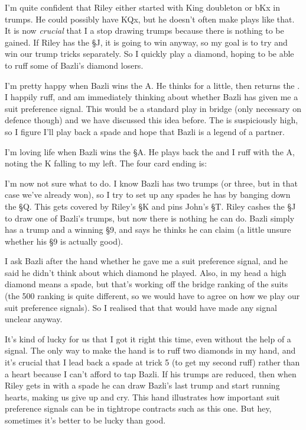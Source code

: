 \documentclass[a4paper]{JoshCards}
\begin{document}
I'm quite confident that Riley either started with King doubleton or bKx in trumps. He could possibly have KQx, but he doesn't often make plays like that. It is now \textit{crucial} that I a stop drawing trumps because there is nothing to be gained. If Riley has the \S J, it is going to win anyway, so my goal is to try and win our trump tricks separately. So I quickly play a diamond, hoping to be able to ruff some of Bazli's diamond losers.

I'm pretty happy when Bazli wins the \D A. He thinks for a little, then returns the . I happily ruff, and am immediately thinking about whether Bazli has given me a suit preference signal. This would be a standard play in bridge (only necessary on defence though) and we have discussed this idea before. The  is suspiciously high, so I figure I'll play back a spade and hope that Bazli is a legend of a partner.

I'm loving life when Bazli wins the \S A. He plays back the  and I ruff with the \C A, noting the \D K falling to my left. The four card ending is:

\gamefont{\larger}
\leftupper{}%
{}{}
\rightupper{}{}{}
\rightlower{}{}{}
\showAll*

I'm now not sure what to do. I know Bazli has two trumps (or three, but in that case we've already won), so I try to set up any spades he has by banging down the \S Q. This gets covered by Riley's \S K and pins John's \S T. Riley cashes the \S J to draw one of Bazli's trumps, but now there is nothing he can do. Bazli simply has a trump and a winning \S 9, and says he thinks he can claim (a little unsure whether his \S 9 is actually good).

I ask Bazli after the hand whether he gave me a suit preference signal, and he said he didn't think about which diamond he played. Also, in my head a high diamond means a spade, but that's working off the bridge ranking of the suits (the 500 ranking is quite different, so we would have to agree on how we play our suit preference signals). So I realised that that would have made any signal unclear anyway. 

It's kind of lucky for us that I got it right this time, even without the help of a signal. The only way to make the hand is to ruff two diamonds in my hand, and it's crucial that I lead back a spade at trick 5 (to get my second ruff) rather than a heart because I can't afford to tap Bazli. If his trumps are reduced, then when Riley gets in with a spade he can draw Bazli's last trump and start running hearts, making us give up and cry. This hand illustrates how important suit preference signals can be in tightrope contracts such as this one. But hey, sometimes it's better to be lucky than good.
\end{document}
